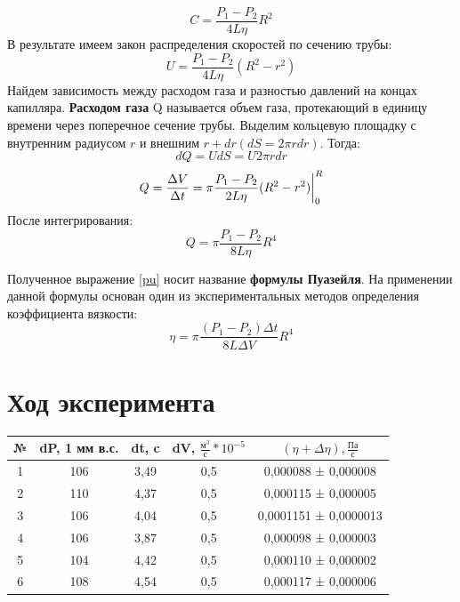 \documentclass[a4paper,12pt]{article}
\begin{document}
$$C = \frac{P_1 - P_2}{4L\eta}R^2$$
В результате имеем закон распределения скоростей по сечению трубы:
\begin{equation}\label{distrib}
U = \frac{P_1 - P_2}{4L\eta}(R^2-r^2)
\end{equation}
Найдем зависимость между расходом газа и разностью давлений на
концах капилляра. \textbf{Расходом газа} Q называется объем газа, протекающий в единицу времени через поперечное сечение трубы.
Выделим кольцевую площадку с внутренним радиусом $r$ и внешним $r + dr (dS = 2\pi rdr)$. Тогда:
$$dQ = UdS = U2\pi rdr$$
$$Q = \frac{\Delta V}{\Delta t} = \pi\frac{P_1 - P_2}{2L\eta}(R^2-r^2)\bigg|_0^R \vspace{0.2cm}$$
После интегрирования:
\begin{equation}\label{pu}
Q = \pi\frac{P_1 - P_2}{8L\eta}R^4
\end{equation}

Полученное выражение \eqref{pu} носит название \textbf{формулы Пуазейля}. На применении данной формулы основан один из экспериментальных методов определения коэффициента вязкости:
\begin{equation}
\eta = \pi\frac{(P_1-P_2)\Delta t}{8L\Delta V}R^4
\end{equation}

\newpage
\section{Ход эксперимента}

\begin{center}
	\begin{tabular}{|c|c|c|c|c|}
		\hline

		№&dP, 1 мм в.с.&dt, c&dV, $\frac{м^3}{с}*10^{-5}$&$(\eta +\Delta\eta), \frac{Па}{с}$\\
		\hline
		1& 106 & 3,49 & 0,5 & 0,000088 ± 0,000008
		\\
		2& 110 & 4,37 & 0,5 & 0,000115 ± 0,000005
		\\
		3& 106 & 4,04 & 0,5 & 0,0001151 ± 0,0000013
		\\
		4& 106 & 3,87 & 0,5 & 0,000098 ± 0,000003
		\\
		5& 104 & 4,42 & 0,5 & 0,000110 ± 0,000002
		\\ 
		6& 108 & 4,54 & 0,5 & 0,000117 ± 0,000006
		\\
		\hline
	\end{tabular}
\end{center}
\end{document}
